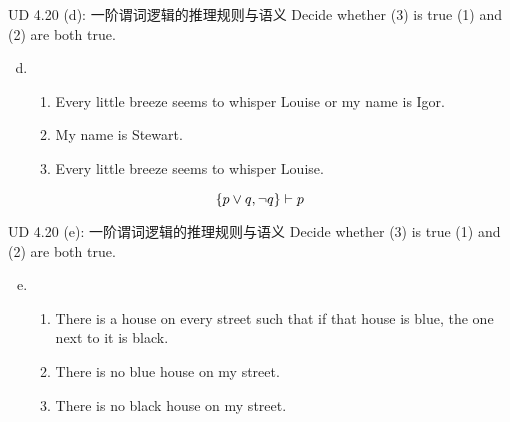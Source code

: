 \begin{frame}{}
  \begin{exampleblock}{UD 4.20 (d): 一阶谓词逻辑的推理规则与语义}
    Decide whether (3) is true  (1) and (2) are both true.

    \begin{enumerate}[(a)]
      \setcounter{enumi}{3}
      \item 
	\begin{enumerate}[(1)]
	  \item Every little breeze seems to whisper Louise or my name is Igor.
	  \item My name is Stewart.
	  \item Every little breeze seems to whisper Louise.
	\end{enumerate}
    \end{enumerate}
  \end{exampleblock}

  \pause
  \begin{center}

    \pause
    \[
      \{p \lor q, \lnot q\} \vdash p
    \]
  \end{center}
\end{frame}

\begin{frame}{}
  \begin{exampleblock}{UD 4.20 (e): 一阶谓词逻辑的推理规则与语义}
    Decide whether (3) is true  (1) and (2) are both true.

    \begin{enumerate}[(a)]
      \setcounter{enumi}{4}
      \item 
	\begin{enumerate}[(1)]
	  \item There is a house on every street such that if that house is blue,
	    the one next to it is black.
	  \item There is no blue house on my street.
	  \item There is no black house on my street.
	\end{enumerate}
    \end{enumerate}
  \end{exampleblock}

  \vspace{0.30cm}



\end{frame}

